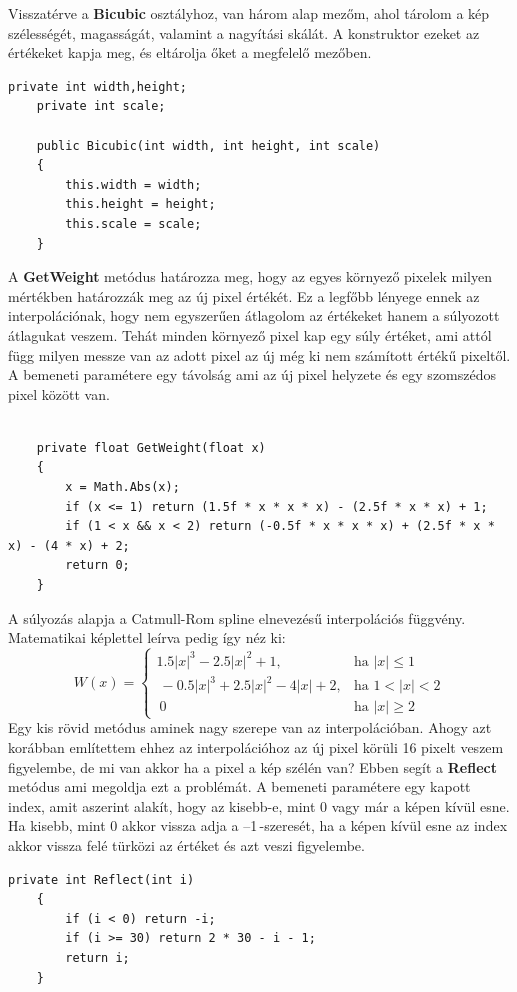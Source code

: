 \documentclass[]{thesis-ekf}
\theoremstyle{definition}
\theoremstyle{remark}
\begin{document}
Visszatérve a \textbf{Bicubic} osztályhoz, van három alap mezőm, ahol tárolom a kép szélességét, magasságát, valamint a nagyítási skálát. A konstruktor ezeket az értékeket kapja meg, és eltárolja őket a megfelelő mezőben.
\begin{lstlisting}[language=CSharp]
	private int width,height;
	private int scale;
	
	public Bicubic(int width, int height, int scale)
	{
		this.width = width;
		this.height = height;
		this.scale = scale;
	}
\end{lstlisting}
A \textbf{GetWeight} metódus határozza meg, hogy az egyes környező pixelek milyen mértékben határozzák meg az új pixel értékét. Ez a legfőbb lényege ennek az interpolációnak, hogy nem egyszerűen átlagolom az értékeket hanem a súlyozott átlagukat veszem. Tehát minden környező pixel kap egy súly értéket, ami attól függ milyen messze van az adott pixel az új még ki nem számított értékű pixeltől. A bemeneti paramétere egy távolság ami az új pixel helyzete és egy szomszédos pixel között van.
\begin{lstlisting}[language=CSharp]
	
	private float GetWeight(float x)
	{
		x = Math.Abs(x);
		if (x <= 1) return (1.5f * x * x * x) - (2.5f * x * x) + 1;
		if (1 < x && x < 2) return (-0.5f * x * x * x) + (2.5f * x * x) - (4 * x) + 2;
		return 0;
	}
\end{lstlisting}
A súlyozás alapja a Catmull-Rom spline\cite{catmull-rom_spline} elnevezésű interpolációs függvény. Matematikai képlettel leírva pedig így néz ki:
\[
W(x) = 
\begin{cases}
	1.5|x|^3 - 2.5|x|^2 + 1, & \text{ha } |x| \leq 1 \\\
	-0.5|x|^3 + 2.5|x|^2 - 4|x| + 2, & \text{ha } 1 < |x| < 2 \\\
	0 & \text{ha } |x| \geq 2
\end{cases}
\]
Egy kis rövid metódus aminek nagy szerepe van az interpolációban. Ahogy azt korábban említettem ehhez az interpolációhoz az új pixel körüli 16 pixelt veszem figyelembe, de mi van akkor ha a pixel a kép szélén van? Ebben segít a \textbf{Reflect} metódus ami megoldja ezt a problémát. A bemeneti paramétere egy kapott index, amit aszerint alakít, hogy az kisebb-e, mint 0 vagy már a képen kívül esne. Ha kisebb, mint 0 akkor vissza adja a --1\,-szeresét, ha a képen kívül esne az index akkor vissza felé türközi az értéket és azt veszi figyelembe.
\begin{lstlisting}[language=CSharp]
	private int Reflect(int i)
	{
		if (i < 0) return -i;
		if (i >= 30) return 2 * 30 - i - 1;
		return i;
	}
\end{lstlisting}
\end{document}

